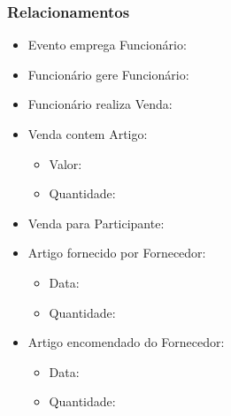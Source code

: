 \documentclass[a4paper,12pt]{scrreprt}
\begin{document}
             \subsubsection{Relacionamentos}
             \begin{itemize}
                 \item{Evento emprega Funcionário:}
                 \item{Funcionário gere Funcionário:}
                 \item{Funcionário realiza Venda:}
                 \item{Venda contem Artigo:}
                     \begin{itemize}
                     \item{Valor:}
                       
                     \item{Quantidade:}
                       
                     \end{itemize}
                 \item{Venda para Participante:}
                 \item{Artigo fornecido por Fornecedor:}
                     \begin{itemize}
                     \item{Data:}
                       
                     \item{Quantidade:}
                       
                     \end{itemize}
                 \item{Artigo encomendado do Fornecedor:}
                     \begin{itemize}
                     \item{Data:}
                       
                     \item{Quantidade:}
                       
                     \end{itemize}
             \end{itemize}
\newpage
\end{document}
